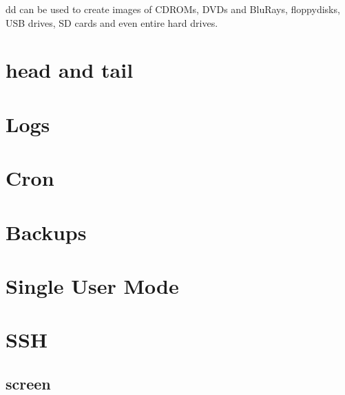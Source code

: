 dd can be used to create images of CDROMs, DVDs and BluRays, floppydisks, USB drives, SD cards and even entire hard drives.

\section{head and tail}

\section{Logs}

\section{Cron}

\section{Backups}

\section{Single User Mode}

\section{SSH}

\subsection{screen}
